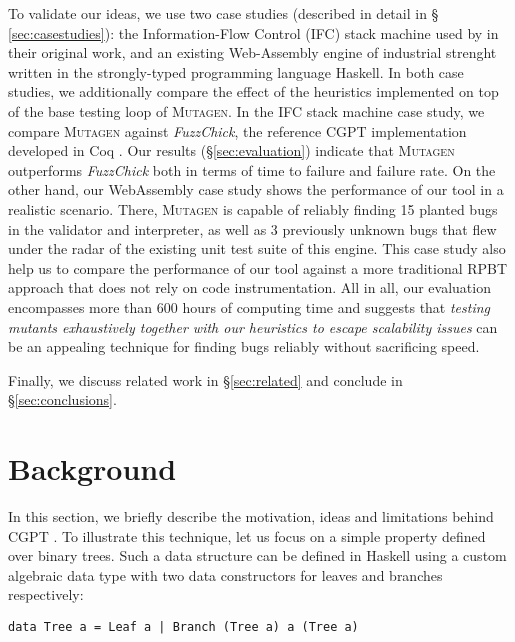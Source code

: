 \documentclass[sigconf, anonymous, review]{acmart}
\newcommand{\fuzzchick}{\textit{FuzzChick}\xspace}
\newcommand{\mutagen}{\textsc{Mutagen}\xspace}
\begin{document}
To validate our ideas, we use two case studies (described in detail in \S
\ref{sec:casestudies}): the Information-Flow Control (IFC) stack machine used by
\citeauthor{lampropoulos2019coverage} in their original work, and an existing
{Web-Assembly} engine of industrial strenght written in the strongly-typed
programming language Haskell.
%
In both case studies, we additionally compare the effect of the heuristics
implemented on top of the base testing loop of \mutagen.
%
In the IFC stack machine case study, we compare \mutagen against \fuzzchick, the
reference CGPT implementation developed in Coq \cite{lampropoulos2019coverage}.
%
Our results (\S \ref{sec:evaluation}) indicate that \mutagen outperforms
\fuzzchick both in terms of time to failure and failure rate.
%
On the other hand, our WebAssembly case study shows the performance of our tool
in a realistic scenario.
%
There, \mutagen is capable of reliably finding 15 planted bugs in the validator
and interpreter, as well as 3 previously unknown bugs that flew under the radar
of the existing unit test suite of this engine.
%
This case study also help us to compare the performance of our tool against a
more traditional RPBT approach that does not rely on code instrumentation.
%
All in all, our evaluation encompasses more than 600 hours of computing time and
suggests that \emph{testing mutants exhaustively together with our heuristics to
  escape scalability issues} can be an appealing technique for
finding bugs reliably without sacrificing speed.

Finally, we discuss related work in \S \ref{sec:related} and conclude
in \S \ref{sec:conclusions}.



\section{Background}
\label{sec:background}

In this section, we briefly describe the motivation, ideas and limitations
behind CGPT \cite{lampropoulos2019coverage}.
%
To illustrate this technique, let us focus on a simple property defined over
binary trees.
%
Such a data structure can be defined in Haskell using a custom algebraic data
type with two data constructors for leaves and branches respectively:

\begin{verbatim}
data Tree a = Leaf a | Branch (Tree a) a (Tree a)
\end{verbatim}
\end{document}
